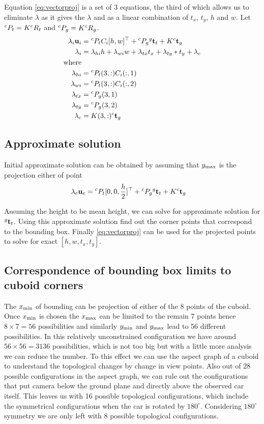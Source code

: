 Equation \eqref{eq:vectorproj} is a set of 3 equations, the third of which allows us to eliminate $\lambda$ as it gives the $\lambda$ and as a linear combination of $t_x$, $t_y$, $h$ and $w$. Let ${}^{c}{P}_{t} = K{}^{c}{R}_{t}$ and ${}^{c}{P}_{g} = K{}^{c}{R}_{g}$.
\begin{align}
  \lambda_i \mathbf{u}_i &=  {}^{c}{P}_{t} C_i [h, w]^\top + {}^{c}{P}_{g} {}^{g}{\mathbf{t}}_{t} + K {}^{c}{\mathbf{t}}_{g}\\
  \lambda_i &= \lambda_{hi}  h + \lambda_{wi}  w + \lambda_{tx}  t_x + \lambda_{ty} * t_y + \lambda_c\\
  \text{where} & \\
  \lambda_{hi} &= {}^{c}{P}_{t}(3, :) C_i(:, 1)\\
  \lambda_{wi} &= {}^{c}{P}_{t}(3, :) C_i(:, 2)\\
  \lambda_{tx} &= {}^{c}{P}_{g}(3, 1)\\
  \lambda_{ty} &= {}^{c}{P}_{g}(3, 2)\\
   \lambda_{c} &= K(3, :) {}^{c}{\mathbf{t}}_{g}
\end{align}

\subsection{Approximate solution}
Initial approximate solution can be obtained by assuming that $y_{\text{max}}$ is the projection either of point 
\begin{align}
  \lambda_c \mathbf{u}_c &= {}^{c}{P}_{t}[0, 0, \frac{h}{2}]^\top + {}^{c}{P}_{g} {}^{g}{\mathbf{t}}_{t} + K{}^{c}{\mathbf{t}}_{g}
\end{align}

Assuming the height to be mean height, we can solve for approximate solution
for ${}^{g}{\mathbf{t}}_{t}$. Using this approximate solution find out the corner points that
correspond to the bounding box. Finally \eqref{eq:vectorproj} can be used for
the projected points to solve for exact $[h, w, t_x, t_y]$.

\subsection{Correspondence of bounding box limits to cuboid corners}
The $x_{\text{min}}$ of bounding can be projection of either of the 8 points of the
cuboid. Once $x_{\text{min}}$ is chosen the $x_{\text{max}}$ can be limited to the remain 7
points hence $8 \times 7= 56$ possibilities and similarly $y_{\text{min}}$ and $y_{\text{max}}$
lead to 56 different possibilities. In this relatively unconstrained
configuration we have around $56 \times 56 = 3136$ possibilities, which is not
too big but with a little more analysis we can reduce the number. To this
effect we can use the aspect graph of a cuboid to understand the topological
changes by change in view points. Also out of 28 possible configurations in the
aspect graph, we can rule out the configurations that put camera below the
ground plane and directly above the observed car itself. This leaves us with 16
possible topological configurations, which include the symmetrical
configurations when the car is rotated by $180^\circ$. Considering $180^\circ$ symmetry we are only left with 8 possible topological configurations.

